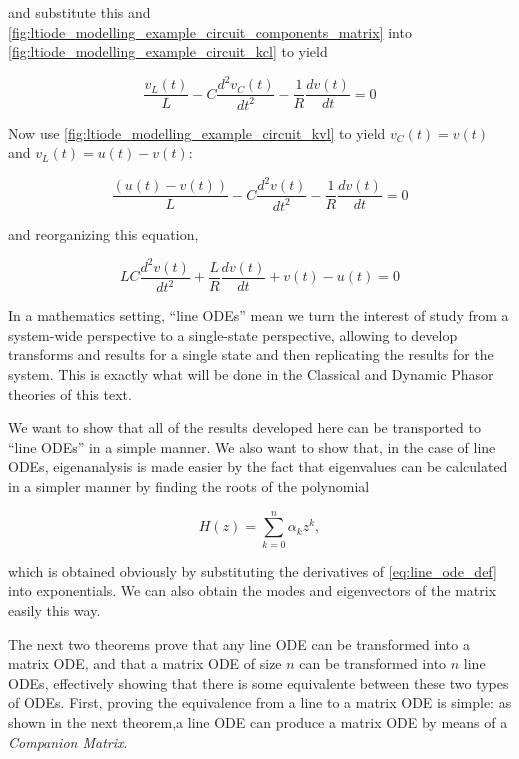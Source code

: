 \begin{example}
	and substitute this and \eqref{fig:ltiode_modelling_example_circuit_components_matrix} into \eqref{fig:ltiode_modelling_example_circuit_kcl} to yield

\begin{equation} \dfrac{v_L(t)}{L} - C\dfrac{d^2v_C(t)}{dt^2} - \dfrac{1}{R}\dfrac{dv(t)}{dt} = 0 \end{equation}

	Now use \eqref{fig:ltiode_modelling_example_circuit_kvl} to yield $v_C(t) = v(t)$ and $v_L(t) = u(t) - v(t)$:

\begin{equation} \dfrac{\left(u(t) - v(t)\right)}{L} - C\dfrac{d^2v(t)}{dt^2} - \dfrac{1}{R}\dfrac{dv(t)}{dt} = 0 \end{equation}

	and reorganizing this equation,

\begin{equation} LC\dfrac{d^2v(t)}{dt^2} + \dfrac{L}{R}\dfrac{dv(t)}{dt} + v(t) - u(t) = 0 \end{equation}

\examplebar
\end{example}

	In a mathematics setting, ``line ODEs'' mean we turn the interest of study from a system-wide perspective to a single-state perspective, allowing to develop transforms and results for a single state and then replicating the results for the system. This is exactly what will be done in the Classical and Dynamic Phasor theories of this text.

	We want to show that all of the results developed here can be transported to ``line ODEs'' in a simple manner. We also want to show that, in the case of line ODEs, eigenanalysis is made easier by the fact that eigenvalues can be calculated in a simpler manner by finding the roots of the polynomial 

\begin{equation} H(z) = \sum\limits_{k=0}^n \alpha_k z^{k}, \end{equation}

	\noindent which is obtained obviously by substituting the derivatives of \eqref{eq:line_ode_def} into exponentials. We can also obtain the modes and eigenvectors of the matrix easily this way.

	The next two theorems prove that any line ODE can be transformed into a matrix ODE, and that a matrix ODE of size $n$ can be transformed into $n$ line ODEs, effectively showing that there is some equivalente between these two types of ODEs. First, proving the equivalence from a line to a matrix ODE is simple: as shown in the next theorem,a line ODE can produce a matrix ODE by means of a \textit{Companion Matrix}.

